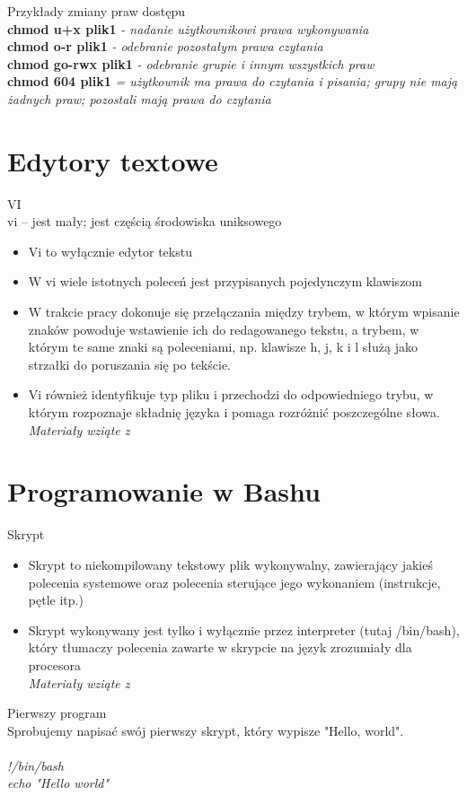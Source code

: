 \documentclass[11pt, a4paper, onecolumn, twoside]{report}
\begin{document}
\Large Przykłady zmiany praw dostępu \\
\normalsize
\textbf{chmod u+x plik1} \textit{- nadanie użytkownikowi prawa wykonywania}\\
\textbf{chmod o-r plik1} \textit{- odebranie pozostałym prawa czytania}\\
\textbf{chmod go-rwx plik1} \textit{- odebranie grupie i innym wszystkich praw}\\
\textbf{chmod 604 plik1} \textit{= użytkownik ma prawa do czytania i pisania; grupy nie mają żadnych praw; pozostali mają prawa do czytania~}

\section{Edytory textowe}
\Large VI\\
\normalsize  vi – jest mały; jest częścią środowiska uniksowego\\
\begin{itemize}
\item Vi to wyłącznie edytor tekstu
\item W vi wiele istotnych poleceń jest przypisanych pojedynczym klawiszom
\item W trakcie pracy dokonuje się przełączania między trybem, w którym wpisanie znaków powoduje wstawienie ich do redagowanego tekstu, a trybem, w którym te same znaki są poleceniami, np. klawisze h, j, k i l służą jako strzałki do poruszania się po tekście. ~
\item Vi również identyfikuje typ pliku i przechodzi do odpowiedniego trybu, w którym rozpoznaje składnię języka i pomaga rozróżnić poszczególne słowa.~ \\
\textit{Materiały wziąte z \cite{Pani}}
\end{itemize}

\section{Programowanie w Bashu}
\label{sec:Bash}
\Large Skrypt
\normalsize 
\begin{itemize}
\item Skrypt to niekompilowany tekstowy plik wykonywalny, zawierający jakieś polecenia systemowe oraz polecenia sterujące jego wykonaniem (instrukcje, pętle itp.) ~
\item Skrypt wykonywany jest tylko i wyłącznie przez interpreter (tutaj /bin/bash), który tłumaczy polecenia zawarte w skrypcie na język zrozumiały dla procesora ~ \\
\textit{Materiały wziąte z \cite{Pani}}
\end{itemize}
\Large Pierwszy program \\
\normalsize Sprobujemy napisać swój pierwszy skrypt, który wypisze "Hello, world". ~ \\
\\
\emph {\Large !/bin/bash \\
echo "Hello world"} \\
\end{document}
